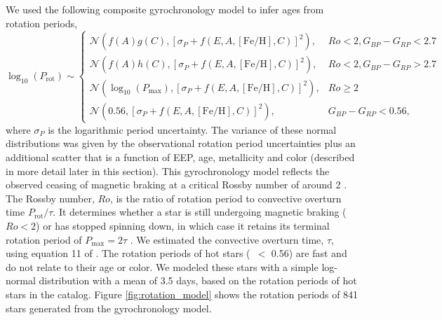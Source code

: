 We used the following composite gyrochronology model to infer ages from
rotation periods,
\begin{equation}
    \log_{10}(P_\mathrm{rot}) \sim \begin{cases}
        \mathcal{N}\left(f(A)g(C), [\sigma_P+f(E, A, \mathrm{[Fe/H]}, C)]^2\right), & Ro < 2,
        G_{BP} - G_{RP} < 2.7 \\
        \mathcal{N}(f(A)h(C), [\sigma_P+f(E, A, \mathrm{[Fe/H]}, C)]^2), & Ro < 2,
        G_{BP} - G_{RP} > 2.7 \\
        \mathcal{N}(\log_{10}(P_\mathrm{max}), [\sigma_P+f(E, A,
        \mathrm{[Fe/H]}, C)]^2),& Ro \geq 2 \\
        \mathcal{N}(0.56, [\sigma_P+f(E, A, \mathrm{[Fe/H]}, C)]^2),& G_{BP} - G_{RP} <
        0.56,
    \end{cases}
\label{eqn:gyro}
\end{equation}
where $\sigma_P$ is the logarithmic period uncertainty.
The variance of these normal distributions was given by the observational
rotation period uncertainties plus an additional scatter that is a function of
EEP, age, metallicity and color (described in more detail later in this
section).
This gyrochronology model reflects the observed ceasing of magnetic braking at
a critical Rossby number of around 2 \citep{vansaders2016}.
The Rossby number, $Ro$, is the ratio of rotation period to convective
overturn time $P_{\mathrm{rot}}/\tau$.
It determines whether a star is still undergoing magnetic braking ($Ro < 2$)
or has stopped spinning down, in which case it retains its terminal rotation
period of $P_\mathrm{max} = 2\tau$ \citep{vansaders2016}.
We estimated the convective overturn time, $\tau$, using equation 11 of
\citet{wright2011}.
The rotation periods of hot stars (\gcolor\ $<$ 0.56) are fast and do
not relate to their age or color.
We modeled these stars with a simple log-normal distribution with a mean of
3.5 days, based on the rotation periods of hot stars in the
\citet{mcquillan2014} catalog.
Figure \ref{fig:rotation_model} shows the rotation periods of 841
stars generated from the gyrochronology model.
